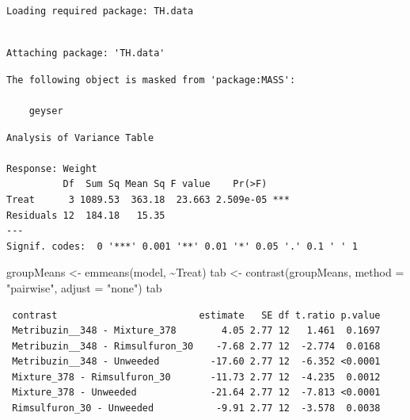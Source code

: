 \documentclass[
  letterpaper,
  DIV=11,
  numbers=noendperiod]{scrreprt}
\newenvironment{Shaded}{\begin{snugshade}}{\end{snugshade}}
\newcommand{\AttributeTok}[1]{\textcolor[rgb]{0.40,0.45,0.13}{#1}}
\newcommand{\FunctionTok}[1]{\textcolor[rgb]{0.28,0.35,0.67}{#1}}
\newcommand{\NormalTok}[1]{\textcolor[rgb]{0.00,0.23,0.31}{#1}}
\newcommand{\OtherTok}[1]{\textcolor[rgb]{0.00,0.23,0.31}{#1}}
\newcommand{\SpecialCharTok}[1]{\textcolor[rgb]{0.37,0.37,0.37}{#1}}
\newcommand{\StringTok}[1]{\textcolor[rgb]{0.13,0.47,0.30}{#1}}
\newcounter{none} %
\begin{document}
\begin{verbatim}
Loading required package: TH.data
\end{verbatim}

\begin{verbatim}

Attaching package: 'TH.data'
\end{verbatim}

\begin{verbatim}
The following object is masked from 'package:MASS':

    geyser
\end{verbatim}

\begin{Shaded}
\end{Shaded}

\begin{verbatim}
Analysis of Variance Table

Response: Weight
          Df  Sum Sq Mean Sq F value    Pr(>F)    
Treat      3 1089.53  363.18  23.663 2.509e-05 ***
Residuals 12  184.18   15.35                      
---
Signif. codes:  0 '***' 0.001 '**' 0.01 '*' 0.05 '.' 0.1 ' ' 1
\end{verbatim}

\begin{Shaded}
\begin{Highlighting}[]
\NormalTok{groupMeans }\OtherTok{\textless{}{-}} \FunctionTok{emmeans}\NormalTok{(model, }\SpecialCharTok{\textasciitilde{}}\NormalTok{Treat)}
\NormalTok{tab }\OtherTok{\textless{}{-}} \FunctionTok{contrast}\NormalTok{(groupMeans, }\AttributeTok{method =} \StringTok{"pairwise"}\NormalTok{, }\AttributeTok{adjust =} \StringTok{"none"}\NormalTok{)}
\NormalTok{tab}
\end{Highlighting}
\end{Shaded}

\begin{verbatim}
 contrast                         estimate   SE df t.ratio p.value
 Metribuzin__348 - Mixture_378        4.05 2.77 12   1.461  0.1697
 Metribuzin__348 - Rimsulfuron_30    -7.68 2.77 12  -2.774  0.0168
 Metribuzin__348 - Unweeded         -17.60 2.77 12  -6.352 <0.0001
 Mixture_378 - Rimsulfuron_30       -11.73 2.77 12  -4.235  0.0012
 Mixture_378 - Unweeded             -21.64 2.77 12  -7.813 <0.0001
 Rimsulfuron_30 - Unweeded           -9.91 2.77 12  -3.578  0.0038
\end{verbatim}
\end{document}
